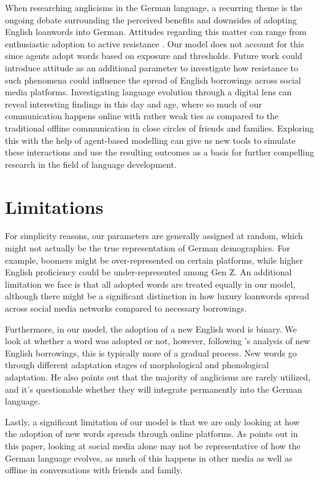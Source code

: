\documentclass[12pt]{article}
\begin{document}
When researching anglicisms in the German language, a recurring theme is the ongoing debate surrounding the perceived benefits and downsides of adopting English loanwords into German. Attitudes regarding this matter can range from enthusiastic adoption to active resistance \parencite{hunt2019}. Our model does not account for this since agents adopt words based on exposure and thresholds. Future work could introduce attitude as an additional parameter to investigate how resistance to such phenomena could influence the spread of English borrowings across social media platforms.  
Investigating language evolution through a digital lens can reveal interesting findings in this day and age, where so much of our communication happens online with rather weak ties as compared to the traditional offline communication in close circles of friends and families. Exploring this with the help of agent-based modelling can give us new tools to simulate these interactions and use the resulting outcomes as a basis for further compelling research in the field of language development. 


\section{Limitations}

For simplicity reasons, our parameters are generally assigned at random, which might not actually be the true representation of German demographics. For example, boomers might be over-represented on certain platforms, while higher English proficiency could be under-represented among Gen Z. 
An additional limitation we face is that all adopted words are treated equally in our model, although there might be a significant distinction in how luxury loanwords spread across social media networks compared to necessary borrowings. 

Furthermore, in our model, the adoption of a new English word is binary. We look at whether a word was adopted or not, however, following \citeauthor{coats2019}'s \parencite*{coats2019} analysis of new English borrowings, this is typically more of a gradual process. New words go through different adaptation stages of morphological and phonological adaptation. He also points out that the majority of anglicisms are rarely utilized, and it’s questionable whether they will integrate permanently into the German language. 


Lastly, a significant limitation of our model is that we are only looking at how the adoption of new words spreads through online platforms. As \textcite{coats2019} points out in this paper, looking at social media alone may not be representative of how the German language evolves, as much of this happens in other media as well as offline in conversations with friends and family. 
\end{document}
